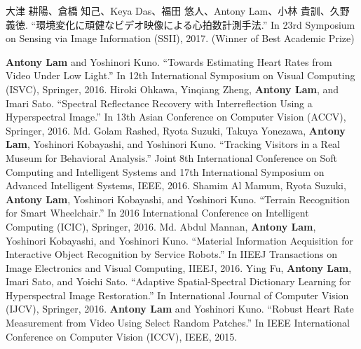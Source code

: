 \documentclass[letterpaper,10pt]{article}
\begin{document}
\begin{CJK}{UTF8}{min}大津 耕陽、倉橋 知己、Keya Das、福田 悠人、Antony Lam、小林 貴訓、久野 義徳. ``環境変化に頑健なビデオ映像による心拍数計測手法.'' In 23rd Symposium on Sensing via Image Information (SSII), 2017. (Winner of Best Academic Prize)\end{CJK}\vspace{0.05in}\newline
\textbf{Antony Lam} and Yoshinori Kuno. ``Towards Estimating Heart Rates from Video Under Low Light.'' In 12th International Symposium on Visual Computing (ISVC), Springer, 2016. \vspace{0.05in}\newline
Hiroki Ohkawa, Yinqiang Zheng, \textbf{Antony Lam}, and Imari Sato. ``Spectral Reflectance Recovery with Interreflection Using a Hyperspectral Image.'' In 13th Asian Conference on Computer Vision (ACCV), Springer, 2016. \vspace{0.05in}\newline
Md. Golam Rashed, Ryota Suzuki, Takuya Yonezawa, \textbf{Antony Lam}, Yoshinori Kobayashi, and Yoshinori Kuno. ``Tracking Visitors in a Real Museum for Behavioral Analysis.''  Joint 8th International Conference on Soft Computing and Intelligent Systems and 17th International Symposium on Advanced Intelligent Systems, IEEE, 2016.  \vspace{0.05in}\newline
Shamim Al Mamum, Ryota Suzuki, \textbf{Antony Lam}, Yoshinori Kobayashi, and Yoshinori Kuno. ``Terrain Recognition for Smart Wheelchair.'' In 2016 International Conference on Intelligent Computing (ICIC), Springer, 2016.
\vspace{0.05in}\newline
Md. Abdul Mannan, \textbf{Antony Lam}, Yoshinori Kobayashi, and Yoshinori Kuno. ``Material Information Acquisition for Interactive Object Recognition by Service Robots.'' In IIEEJ Transactions on Image Electronics and Visual Computing, IIEEJ, 2016.\vspace{0.05in}\newline
Ying Fu, \textbf{Antony Lam}, Imari Sato, and Yoichi Sato. ``Adaptive Spatial-Spectral Dictionary Learning for Hyperspectral Image Restoration.'' In International Journal of Computer Vision (IJCV), Springer, 2016.\vspace{0.05in}\newline
\textbf{Antony Lam} and Yoshinori Kuno. ``Robust Heart Rate Measurement from Video Using Select Random Patches.'' In IEEE International Conference on Computer Vision (ICCV), IEEE, 2015.\vspace{0.05in}\newline
\end{document}

